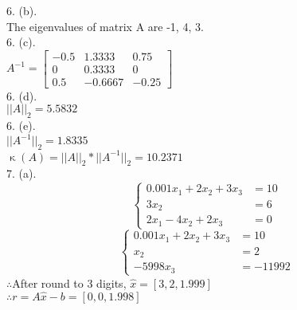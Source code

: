 \documentclass[a4paper]{article}
\begin{document}
6. (b).\\
The eigenvalues of matrix A are -1, 4, 3.\\

6. (c).\\
$A^{-1}=
\begin{bmatrix}
-0.5 & 1.3333  & 0.75  \\
0    & 0.3333  & 0     \\
0.5  & -0.6667 & -0.25
\end{bmatrix}
$\\

6. (d).\\
$||A||_2=5.5832$\\

6. (e).\\
$||A^{-1}||_2=1.8335$\\
$\upkappa(A)=||A||_2 * ||A^{-1}||_2=10.2371$\\


7. (a).\\
\begin{equation}
  \left\{
   \begin{aligned}
       0.001x_1+2x_2+3x_3 &=10\\
       3x_2 &= 6 \\
       2x_1-4x_2+2x_3 &= 0
   \end{aligned}
  \right.
\end{equation}
\begin{equation}
  \left\{
   \begin{aligned}
       0.001x_1+2x_2+3x_3 &=10\\
       x_2 &= 2 \\
       -5998x_3 &= -11992
   \end{aligned}
  \right.
\end{equation}
$\therefore $After round to 3 digits, $\hat{x} = [3, 2, 1.999]$\\
$\therefore r=A\hat{x}-b=[0, 0, 1.998]$\\
\end{document}
